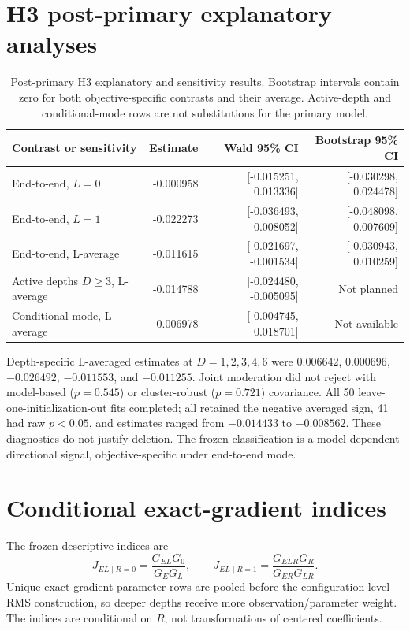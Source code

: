 \documentclass[pdflatex,sn-basic,Numbered]{sn-jnl}
\begin{document}
\section{H3 post-primary explanatory analyses}

\begin{table}[t]
\centering\small
\begin{tabular}{lrrr}
\toprule
Contrast or sensitivity & Estimate & Wald 95\% CI & Bootstrap 95\% CI \\
\midrule
End-to-end, $L=0$ & -0.000958 & [-0.015251, 0.013336] & [-0.030298, 0.024478] \\
End-to-end, $L=1$ & -0.022273 & [-0.036493, -0.008052] & [-0.048098, 0.007609] \\
End-to-end, L-average & -0.011615 & [-0.021697, -0.001534] & [-0.030943, 0.010259] \\
Active depths $D\ge3$, L-average & -0.014788 & [-0.024480, -0.005095] & Not planned \\
Conditional mode, L-average & 0.006978 & [-0.004745, 0.018701] & Not available \\
\bottomrule
\end{tabular}
\caption{Post-primary H3 explanatory and sensitivity results. Bootstrap intervals contain zero for both objective-specific contrasts and their average. Active-depth and conditional-mode rows are not substitutions for the primary model.}
\end{table}

Depth-specific L-averaged estimates at $D=1,2,3,4,6$ were $0.006642$, $0.000696$, $-0.026492$, $-0.011553$, and $-0.011255$. Joint moderation did not reject with model-based ($p=0.545$) or cluster-robust ($p=0.721$) covariance. All 50 leave-one-initialization-out fits completed; all retained the negative averaged sign, 41 had raw $p<0.05$, and estimates ranged from $-0.014433$ to $-0.008562$. These diagnostics do not justify deletion. The frozen classification is a model-dependent directional signal, objective-specific under end-to-end mode.

\section{Conditional exact-gradient indices}

The frozen descriptive indices are
\[
J_{EL\mid R=0}=\frac{G_{EL}G_0}{G_EG_L},\qquad
J_{EL\mid R=1}=\frac{G_{ELR}G_R}{G_{ER}G_{LR}}.
\]
Unique exact-gradient parameter rows are pooled before the configuration-level RMS construction, so deeper depths receive more observation/parameter weight. The indices are conditional on $R$, not transformations of centered coefficients.
\end{document}
